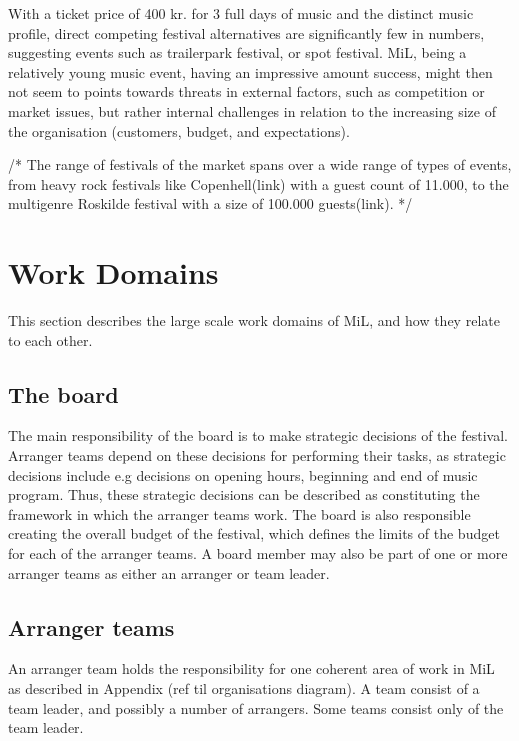 \bigskip

With a ticket price of 400 kr. for 3 full days of music and the distinct music profile, direct competing festival alternatives are significantly few in numbers, suggesting events such as trailerpark festival, or spot festival. MiL, being a relatively young music event, having an impressive amount success, might then not seem to points towards threats in external factors, such as competition or market issues, but rather internal challenges in relation to the increasing size of the organisation (customers, budget, and expectations). 

\bigskip

/*
The range of festivals of the market spans over a wide range of types of events, from heavy rock festivals like Copenhell(link) with a guest count of 11.000, to the multigenre Roskilde festival with a size of 100.000 guests(link). 
*/


\section{Work Domains}
\label{sec:work_domains}
This section describes the large scale work domains of MiL, and how they relate to each other.
\subsection{The board}
\label{sub:the_board}
The main responsibility of the board is to make strategic decisions of the festival. Arranger teams depend on these decisions for performing their tasks, as strategic decisions include e.g decisions on opening hours, beginning and end of music program. Thus, these strategic decisions can be described as constituting the framework in which the arranger teams work. The board is also responsible creating the overall budget of the festival, which defines the limits of the budget for each of the arranger teams. A board member may also be part of one or more arranger teams as either an arranger or team leader.

\subsection{Arranger teams} %
\label{sub:arranger_team}
An arranger team holds the responsibility for one coherent area of work in MiL as described in Appendix (ref til organisations diagram). A team consist of a team leader, and possibly a number of arrangers. Some teams consist only of the team leader.

